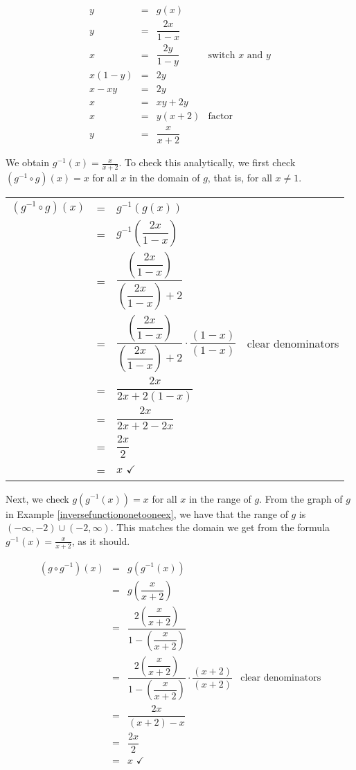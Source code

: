 \begin{ex}
\begin{enumerate}
\[ \begin{array}{rclr}
y & = & g(x) & \\ [5pt]
y & = &  \dfrac{2x}{1-x} & \\ [7pt]
x & = & \dfrac{2y}{1-y} & \mbox{switch $x$ and $y$} \\ [3pt]
x(1-y) & = & 2y & \\ [3pt]
x-xy & = & 2y & \\ [3pt]
x & = & xy + 2y & \\ [3pt]
x & = & y(x+2) & \mbox{factor}\\ [8pt]
y & = & \dfrac{x}{x+2}
\end{array} \]

We obtain $g^{-1}(x) = \frac{x}{x+2}$.  To check this analytically, we first check $\left(g^{-1} \circ g \right)(x) = x$ for all $x$ in the domain of $g$, that is, for all $x \neq 1$.

\begin{longtable}{rclr}
$\left(g^{-1} \circ g \right)(x)$ & = & $g^{-1}(g(x))$ & \\ [7pt]
& = & $g^{-1} \left(\dfrac{2x}{1-x}\right)$ & \\ [20pt]
& = & $\dfrac{ \left(\dfrac{2x}{1-x}\right)}{ \left(\dfrac{2x}{1-x}\right)+2}$ & \\ [30pt]
& = & $\dfrac{ \left(\dfrac{2x}{1-x}\right)}{ \left(\dfrac{2x}{1-x}\right)+2} \cdot \dfrac{(1-x)}{(1-x)}$ & clear denominators \\ [15pt]
& = & $\dfrac{ 2x}{ 2x + 2(1-x)}$ & \\ [15pt]
& = & $\dfrac{2x}{2x+2-2x}$ & \\ [15pt]
& = & $\dfrac{2x}{2}$ & \\ [7pt]
& = & $x \, \, \checkmark$ & \\
\end{longtable}

Next, we check $g\left(g^{-1}(x)\right)= x$ for all $x$ in the range of $g$.  From the graph of $g$ in Example \ref{inversefunctiononetooneex}, we have that the range of $g$ is $(-\infty, -2) \cup (-2,\infty)$.  This matches the domain we get from the formula $g^{-1}(x) = \frac{x}{x+2}$, as it should.  

\[ \begin{array}{rclr}
\left(g \circ g^{-1} \right)(x) & = & g\left(g^{-1}(x)\right) & \\ [15pt]
 & = & g \left(\dfrac{x}{x+2}\right) & \\ [15pt]
& = & \dfrac{ 2\left(\dfrac{x}{x+2}\right)}{ 1-\left(\dfrac{x}{x+2}\right)} \\ [30pt]
& = & \dfrac{ 2\left(\dfrac{x}{x+2}\right)}{ 1-\left(\dfrac{x}{x+2}\right)} \cdot \dfrac{(x+2)}{(x+2)}  & \mbox{clear denominators} \\ [30pt]
& = & \dfrac{ 2x}{ (x+2) -x} & \\ [15pt]
& = & \dfrac{2x}{2} & \\ [15pt]
& = & x \, \, \checkmark \\
\end{array} \]


\end{enumerate}
\end{ex}
